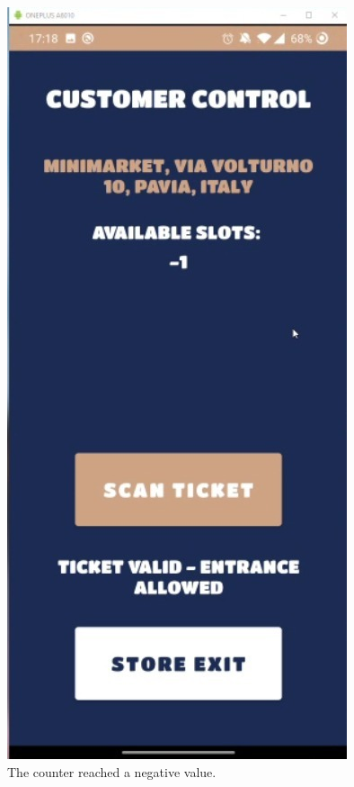 \documentclass[table, 12pt]{article}
\begin{document}
\begin{figure}[H]
    \centering
    \includegraphics[width=\textwidth/3]{assets/screenshots/oh_no.jpg}
    \caption{The counter reached a negative value.}
    \label{counter_going_brr}
\end{figure}
\end{document}
